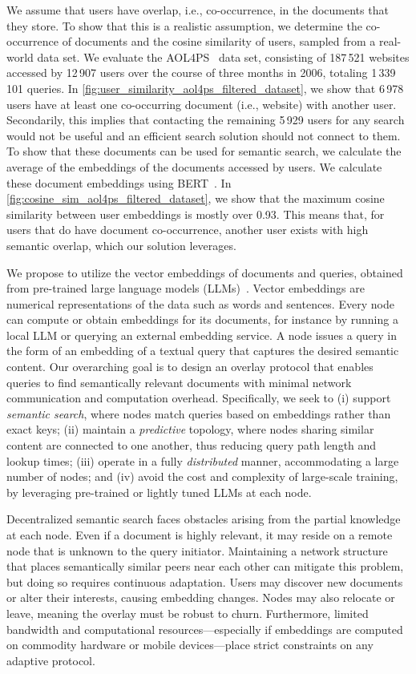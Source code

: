 \documentclass[10pt,journal]{IEEEtran}
\begin{document}
We assume that users have overlap, i.e., co-occurrence, in the documents that they store.
To show that this is a realistic assumption, we determine the co-occurrence of documents and the cosine similarity of users, sampled from a real-world data set.
We evaluate the AOL4PS~\cite{guo2021aol4ps} data set, consisting of 187\,521 websites accessed by 12\,907 users over the course of three months in 2006, totaling 1\,339\,101 queries.
In \autoref{fig:user_similarity_aol4ps_filtered_dataset}, we show that 6\,978 users have at least one co-occurring document (i.e., website) with another user.
Secondarily, this implies that contacting the remaining 5\,929 users for any search would not be useful and an efficient search solution should not connect to them.
To show that these documents can be used for semantic search, we calculate the average of the embeddings of the documents accessed by users.
We calculate these document embeddings using BERT~\cite{kenton2019bert}.
In \autoref{fig:cosine_sim_aol4ps_filtered_dataset}, we show that the maximum cosine similarity between user embeddings is mostly over 0.93.
This means that, for users that do have document co-occurrence, another user exists with high semantic overlap, which our solution leverages.

We propose to utilize the vector embeddings of documents and queries, obtained from pre-trained large language models (LLMs)~\cite{min2023recent}. Vector embeddings are numerical representations of the data such as words and sentences. Every node can compute or obtain embeddings for its documents, for instance by running a local LLM or querying an external embedding service. A node issues a query in the form of an embedding of a textual query that captures the desired semantic content. Our overarching goal is to design an overlay protocol that enables queries to find semantically relevant documents with minimal network communication and computation overhead. Specifically, we seek to (i) support \emph{semantic search}, where nodes match queries based on embeddings rather than exact keys; (ii) maintain a \emph{predictive} topology, where nodes sharing similar content are connected to one another, thus reducing query path length and lookup times; (iii) operate in a fully \emph{distributed} manner, accommodating a large number of nodes; and (iv) avoid the cost and complexity of large-scale training, by leveraging pre-trained or lightly tuned LLMs at each node.

Decentralized semantic search faces obstacles arising from the partial knowledge at each node. Even if a document is highly relevant, it may reside on a remote node that is unknown to the query initiator. Maintaining a network structure that places semantically similar peers near each other can mitigate this problem, but doing so requires continuous adaptation. Users may discover new documents or alter their interests, causing embedding changes. Nodes may also relocate or leave, meaning the overlay must be robust to churn. Furthermore, limited bandwidth and computational resources—especially if embeddings are computed on commodity hardware or mobile devices—place strict constraints on any adaptive protocol.
\end{document}
